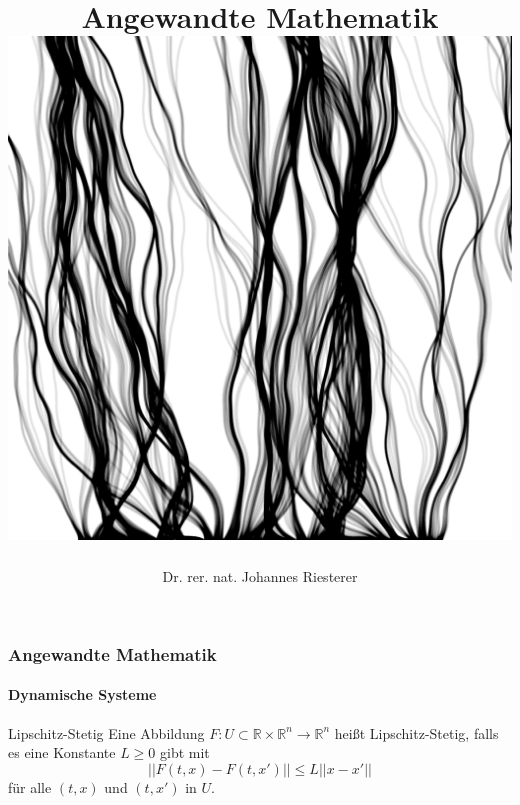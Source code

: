 \documentclass{beamer}
\begin{document}
\title[Angewandte Mathematik] %
{Angewandte Mathematik
\\
\includegraphics[scale=0.15]{images/cover}
}
\subtitle{}
\author[Dr. Johannes Riesterer] %
{Dr.  rer. nat. Johannes Riesterer}

\date[KPT 2004] %
{}

\subject{Angewandte Mathematik}



\frame{\titlepage}


\begin{frame}
    \frametitle{Angewandte Mathematik}
\framesubtitle{Dynamische Systeme }
\begin{block}{Lipschitz-Stetig}
Eine  Abbildung $F : U \subset \mathbb{R} \times \mathbb{R}^n \to \mathbb{R}^n$ heißt Lipschitz-Stetig,
falls es eine Konstante $L \geq 0$ gibt  mit
$$ || F(t,x) - F(t,x') ||  \leq L || x -x' ||  $$
für alle $(t,x)$ und $(t,x')$ in $U$.
\end{block}

 \end{frame}
\end{document}
